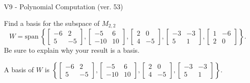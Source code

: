 \begin{exercise}
  \begin{exerciseTitle}V9 - Polynomial Computation (ver. 53)\end{exerciseTitle}
  \begin{exerciseStatement}
    Find a basis for the subspace of \(M_{2,2}\) 
\[W=\mathrm{span}\ \left\{\left[\begin{array}{cc}
-6 & 2 \\
5 & -5
\end{array}\right] , \left[\begin{array}{cc}
-5 & 6 \\
-10 & 10
\end{array}\right] , \left[\begin{array}{cc}
2 & 0 \\
4 & -5
\end{array}\right] , \left[\begin{array}{cc}
-3 & -3 \\
5 & 1
\end{array}\right] , \left[\begin{array}{cc}
1 & -6 \\
2 & 0
\end{array}\right]\right\}.\]
 Be sure to explain why your result is a basis.


  \end{exerciseStatement}
  \begin{exerciseAnswer}
   A basis of \(W\) is  \(\left\{\left[\begin{array}{cc}
-6 & 2 \\
5 & -5
\end{array}\right] , \left[\begin{array}{cc}
-5 & 6 \\
-10 & 10
\end{array}\right] , \left[\begin{array}{cc}
2 & 0 \\
4 & -5
\end{array}\right] , \left[\begin{array}{cc}
-3 & -3 \\
5 & 1
\end{array}\right]\right\}\).
  


  \end{exerciseAnswer}
\end{exercise}